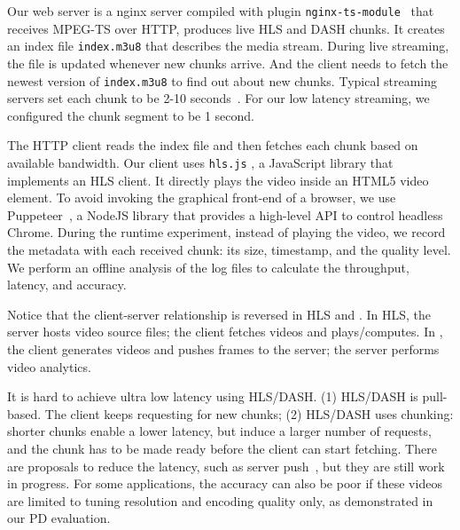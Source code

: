  Our web server is a nginx server compiled with plugin
\texttt{nginx-ts-module}~\cite{nginx-ts-module} that receives MPEG-TS over HTTP,
produces live HLS and DASH chunks. It creates an index file \texttt{index.m3u8}
that describes the media stream. During live streaming, the file is updated
whenever new chunks arrive. And the client needs to fetch the newest version of
\texttt{index.m3u8} to find out about new chunks. Typical streaming servers set
each chunk to be 2-10 seconds~\cite{mao2017neural, sun2016cs2p,
  wang2016anatomy}. For our low latency streaming, we configured the chunk
segment to be 1 second.

 The HTTP client reads the index file and then fetches each
chunk based on available bandwidth. Our client uses \texttt{hls.js}
\cite{hls.js}, a JavaScript library that implements an HLS client. It directly
plays the video inside an HTML5 video element. To avoid invoking the graphical
front-end of a browser, we use Puppeteer~\cite{puppeteer}, a NodeJS library that
provides a high-level API to control headless Chrome. During the runtime
experiment, instead of playing the video, we record the metadata with each
received chunk: its size, timestamp, and the quality level. We perform an
offline analysis of the log files to calculate the throughput, latency, and
accuracy.

Notice that the client-server relationship is reversed in HLS and \awstream{}. In
HLS, the server hosts video source files; the client fetches videos and
plays/computes. In \awstream{}, the client generates videos and pushes frames to
the server; the server performs video analytics.

\vspace{0.5em}

 It is hard to achieve
ultra low latency using HLS/DASH. (1) HLS/DASH is pull-based. The client keeps
requesting for new chunks; (2) HLS/DASH uses chunking: shorter chunks enable a
lower latency, but induce a larger number of requests, and the chunk has to be
made ready before the client can start fetching. There are proposals to reduce
the latency, such as server push~\cite{wei2014low}, but they are still work in
progress. For some applications, the accuracy can also be poor if these videos
are limited to tuning resolution and encoding quality only, as demonstrated in
our PD evaluation.

